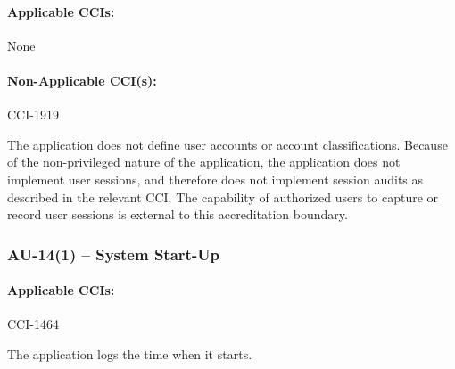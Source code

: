 \documentclass[letterpaper, 10pt, twoside]{article}
\begin{document}
\paragraph{Applicable CCIs:} None

\paragraph{Non-Applicable CCI(s):} CCI-1919

The application does not define user accounts or account classifications. Because of the non-privileged nature of the application, the application does not implement user sessions, and therefore does not implement session audits as described in the relevant CCI. The capability of authorized users to capture or record user sessions is external to this accreditation boundary.

\subsubsection{AU-14(1) -- System Start-Up}

\paragraph{Applicable CCIs:} CCI-1464

The application logs the time when it starts.

\clearpage
\printbibliography
\end{document}
